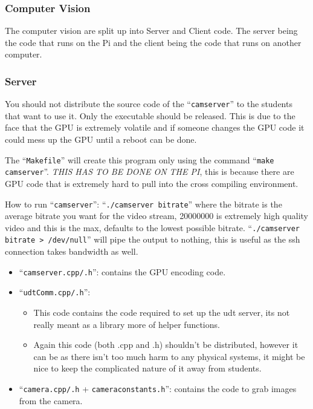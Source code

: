 \documentclass{article}
\begin{document}
\subsubsection{Computer Vision}
The computer vision are split up into Server and Client code. The server being the code that runs on the Pi and the client being the code that runs on another computer.
\subsubsection{Server}
You should not distribute the source code of the ``{\tt camserver}'' to the students that want to use it. Only the executable should be released. This is due to the face that the GPU is extremely volatile and if someone changes the GPU code it could mess up the GPU until a reboot can be done.

The ``{\tt Makefile}'' will create this program only using the command ``{\tt make camserver}''. \emph{THIS HAS TO BE DONE ON THE PI}, this is because there are GPU code that is extremely hard to pull into the cross compiling environment.

How to run ``{\tt camserver}'':  ``{\tt ./camserver bitrate}'' where the bitrate is the average bitrate you want for the video stream, 20000000 is extremely high quality video and this is the max, defaults to the lowest possible bitrate. ``{\tt ./camserver bitrate > /dev/null}'' will pipe the output to nothing, this is useful as the ssh connection takes bandwidth as well.

\begin{itemize}
    \item ``{\tt camserver.cpp/.h}'': contains the GPU encoding code.
    \item ``{\tt udtComm.cpp/.h}'':
    \begin{itemize}
        \item This code contains the code required to set up the udt server, its not really meant as a library more of helper functions.
        \item Again this code (both .cpp and .h) shouldn't be distributed, however it can be as there isn't too much harm to any physical systems, it might be nice to keep the complicated nature of it away from students.
    \end{itemize}
    \item ``{\tt camera.cpp/.h} + {\tt cameraconstants.h}'': contains the code to grab images from the camera.
\end{itemize}
\end{document}
